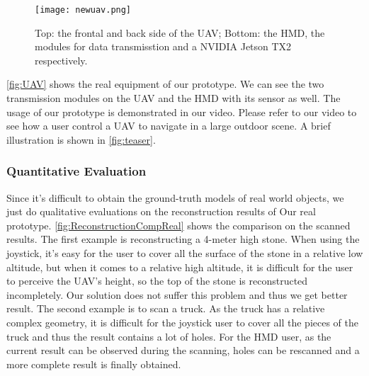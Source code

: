 \documentclass[journal]{IEEEtran}
\begin{document}
\begin{figure}[t]
  \centering
  \texttt{[image: newuav.png]}
  \caption{Top: the frontal and back side of the UAV; 
  Bottom: the HMD, the modules for data transmisstion and a NVIDIA Jetson TX2 respectively.
  }
  \label{fig:UAV}
\end{figure}

\autoref{fig:UAV} shows the real equipment of our prototype. We can see the two
transmission modules on the UAV and the HMD with its sensor as well.
The usage of our prototype is demonstrated in our video. Please refer to our video to see 
how a user control a UAV to navigate in a large outdoor scene. A brief illustration 
is shown in \autoref{fig:teaser}.

\subsubsection{Quantitative Evaluation}
Since it's difficult to obtain the ground-truth models of real world objects, we 
just do qualitative evaluations on the reconstruction results of Our real prototype. 
\autoref{fig:ReconstructionCompReal} shows the comparison on the scanned results.
The first example is reconstructing a 4-meter high stone. When using the joystick, it's easy for the user to cover all 
the surface of the stone in a relative low altitude, but when it comes to a relative high altitude, it is difficult for the 
user to perceive the UAV's height, so the top of the stone is reconstructed incompletely. Our solution does not suffer this problem and thus we get better result. 
The second example is to scan a truck. 
As the truck has a relative complex geometry, it is difficult for the joystick user to cover all the pieces of the truck and thus the result contains a lot of holes. For the HMD user, as the current result can be observed during the scanning, holes can be rescanned and a more complete result is finally obtained.  

\end{document}
